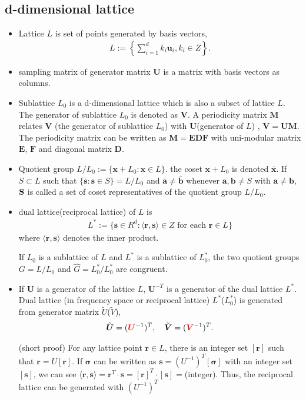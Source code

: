 \documentclass[10pt]{book}
\def\bm{\boldsymbol}
\newcommand{\bea}{\begin{eqnarray}}
\newcommand{\eea}{\end{eqnarray}}
\def\vs{{\bm \sigma}}
\def\vr{{\bm r}}
\def\la{\langle}
\def\ra{\rangle}
\begin{document}
\subsection{d-dimensional lattice}
\begin{itemize}
\item Lattice $L$ is set of points generated by basis vectors,
\bea 
L:=\left\{ \sum_{i=1}^d k_i {\bm u}_i, k_i\in Z\right\}.
\eea 
\item sampling matrix of generator matrix ${\bm U}$ is a matrix with basis vectors as columns. 
\item Sublattice $L_0$ is a d-dimensional lattice which is also a subset of lattice $L$. 
      The generator of sublattice $L_0$ is denoted as ${\bm V}$. 
      A periodicity matrix ${\bm M}$ relates ${\bm V}$ (the generator of sublattice $L_0$)
      with ${\bm U}$(generator of $L$) , ${\bm V}={\bm U}{\bm M}$.  
      The periodicity matrix can be written as ${\bm M}={\bm E}{\bm D}{\bm F}$
      with uni-modular matrix ${\bm E}$, ${\bm F}$ and diagonal matrix ${\bm D}$.
      
\item Quotient group $L/L_0:=\{{\bm x}+L_0 :{\bm x}\in L \}$. 
      the coset ${\bm x}+L_0$ is denoted $\bar{\bm x}$.
     If $S\subset L$ such that $\{\bar{\bm s}: {\bm s}\in S\}=L/L_0$ and $\bar{\bm a}\neq \bar{\bm b}$
     whenever ${\bm a},{\bm b}\neq S$ with ${\bm a}\neq {\bm b}$, 
     ${\bf S}$ is called a set of coset representatives of the quotient group $L/L_0$.
\item dual lattice(reciprocal lattice) of $L$ is 
\bea 
L^* :=\{ {\bm s}\in R^d: \la {\bm r},{\bm s}\ra \in Z \mbox{ for each } {\bm r} \in L   \}
\eea 
where $\la {\bm r},{\bm s}\ra $ denotes the inner product. 

If $L_0$ is a sublattice of $L$ and $L^*$ is a sublattice of $L^*_0$, the two quotient groups
$G=L/L_0$ and $\widehat{G}=L_0^*/ L_0^*$ are congruent. 

\item If ${\bm U}$ is a generator of the lattice $L$, ${\bm U}^{-T}$ is a generator of the dual lattice 
$L^*$. Dual lattice (in frequency space or reciprocal lattice) 
$L^*$($L_0^*$) is generated from 
generator matrix $\tilde{U}$($\tilde{V}$),
\bea 
\tilde{\bm U}=({\color{red}\bm U}^{-1})^T,\quad \tilde{\bm V}=({\color{red} \bm V}^{-1})^T.
\eea 

(short proof) For any lattice point $\vr\in L$, there is 
an integer set $[\vr]$ such that $\vr=U[\vr]$. 
If $\vs$ can be written as ${\bm s}=(U^{-1})^T[\vs]$ with an integer set $[{\bm s}]$,
we can see $\la \vr,{\bm s} \ra=\vr^T \cdot {\bm s}=[\vr]^T\cdot [{\bm s}]=$(integer). 
Thus, the reciprocal lattice can be generated with $(U^{-1})^T$


\end{itemize}
\end{document}
